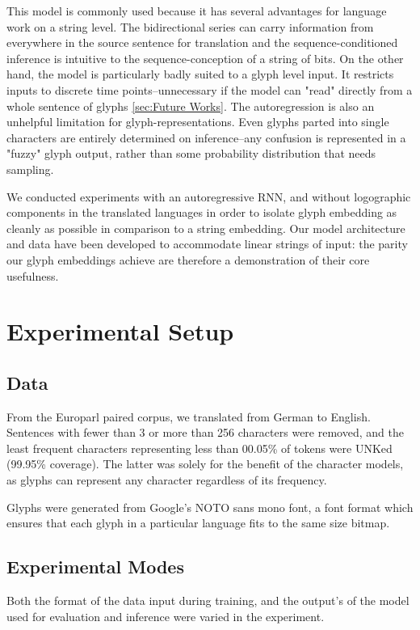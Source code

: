 \documentclass{article}
\begin{document}
This model is commonly used because it has several advantages for language work on a string level. The bidirectional series can carry information from everywhere in the source sentence for translation and the sequence-conditioned inference is intuitive to the sequence-conception of a string of bits.  On the other hand, the model is particularly badly suited to a glyph level input. It restricts inputs to discrete time points--unnecessary if the model can "read" directly from a whole sentence of glyphs \ref{sec:Future Works}. The autoregression is also an unhelpful limitation for glyph-representations. Even glyphs parted into single characters are entirely determined on inference--any confusion is represented in a "fuzzy" glyph output, rather than some probability distribution that needs sampling.

We conducted experiments with an autoregressive RNN, and without logographic components in the translated languages in order to isolate glyph embedding as cleanly as possible in comparison to a string embedding. Our model architecture and data have been developed to accommodate linear strings of input: the parity our glyph embeddings achieve are therefore a demonstration of their core usefulness. 

\section{Experimental Setup}

\subsection{Data}
From the Europarl paired corpus, we translated from German to English. Sentences with fewer than 3 or more than 256 characters were removed, and the least frequent characters representing less than 00.05\% of tokens were UNKed (99.95\% coverage). The latter was solely for the benefit of the character models, as glyphs can represent any character regardless of its frequency.

Glyphs were generated from Google's NOTO sans mono font, a font format which ensures that each glyph in a particular language fits to the same size bitmap. 

\subsection{Experimental Modes}

Both the format of the data input during training, and the output's of the model used for evaluation and inference were varied in the experiment.
\end{document}
